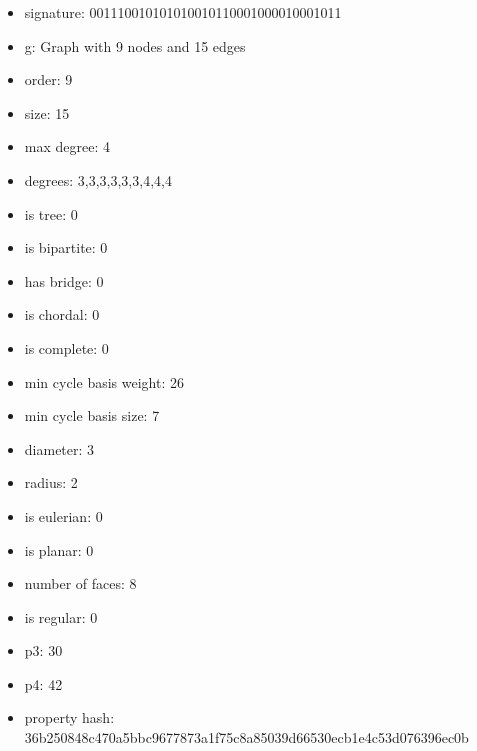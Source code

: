 \begin{figure}
\end{figure}
\begin{itemize}
\item signature: 001110010101010010110001000010001011
\item g: Graph with 9 nodes and 15 edges
\item order: 9
\item size: 15
\item max degree: 4
\item degrees: 3,3,3,3,3,3,4,4,4
\item is tree: 0
\item is bipartite: 0
\item has bridge: 0
\item is chordal: 0
\item is complete: 0
\item min cycle basis weight: 26
\item min cycle basis size: 7
\item diameter: 3
\item radius: 2
\item is eulerian: 0
\item is planar: 0
\item number of faces: 8
\item is regular: 0
\item p3: 30
\item p4: 42
\item property hash: 36b250848c470a5bbc9677873a1f75c8a85039d66530ecb1e4c53d076396ec0b
\end{itemize}
\newpage
